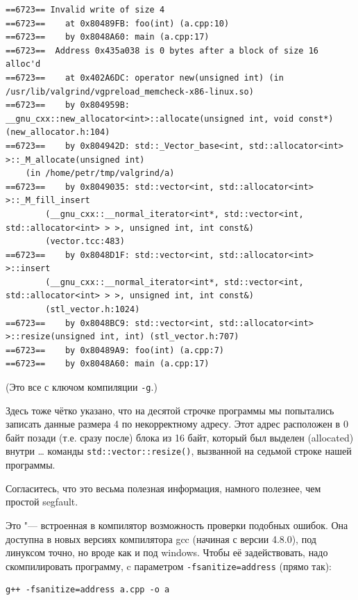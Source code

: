 \documentclass[a4paper,10pt]{problems}
\begin{document}
{\footnotesize
\begin{verbatim}
==6723== Invalid write of size 4
==6723==    at 0x80489FB: foo(int) (a.cpp:10)
==6723==    by 0x8048A60: main (a.cpp:17)
==6723==  Address 0x435a038 is 0 bytes after a block of size 16 alloc'd
==6723==    at 0x402A6DC: operator new(unsigned int) (in /usr/lib/valgrind/vgpreload_memcheck-x86-linux.so)
==6723==    by 0x804959B: __gnu_cxx::new_allocator<int>::allocate(unsigned int, void const*) (new_allocator.h:104)
==6723==    by 0x804942D: std::_Vector_base<int, std::allocator<int> >::_M_allocate(unsigned int) 
    (in /home/petr/tmp/valgrind/a)
==6723==    by 0x8049035: std::vector<int, std::allocator<int> >::_M_fill_insert
        (__gnu_cxx::__normal_iterator<int*, std::vector<int, std::allocator<int> > >, unsigned int, int const&) 
        (vector.tcc:483)
==6723==    by 0x8048D1F: std::vector<int, std::allocator<int> >::insert
        (__gnu_cxx::__normal_iterator<int*, std::vector<int, std::allocator<int> > >, unsigned int, int const&) 
        (stl_vector.h:1024)
==6723==    by 0x8048BC9: std::vector<int, std::allocator<int> >::resize(unsigned int, int) (stl_vector.h:707)
==6723==    by 0x80489A9: foo(int) (a.cpp:7)
==6723==    by 0x8048A60: main (a.cpp:17)
\end{verbatim}
\par
}
(Это все с ключом компиляции \verb`-g`.)

Здесь тоже чётко указано, что на десятой строчке программы мы попытались записать данные размера 4 по некорректному адресу. 
Этот адрес расположен в 0 байт позади (т.е. сразу после) блока из 16 байт, который был выделен (allocated) внутри \dots{} команды \verb`std::vector::resize()`,
вызванной на седьмой строке нашей программы.

Согласитесь, что это весьма полезная информация, намного полезнее, чем простой segfault.

Это "--- встроенная в компилятор возможность проверки подобных ошибок.
Она доступна в новых версиях компилятора gcc (начиная с версии 4.8.0), под линуксом точно, но вроде как и под windows.
Чтобы её задействовать, надо скомпилировать программу, c параметром \verb`-fsanitize=address` (прямо так):
\begin{verbatim}
g++ -fsanitize=address a.cpp -o a
\end{verbatim}
\end{document}
